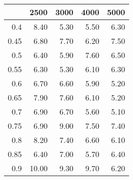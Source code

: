 \begin{table}[ht]
\centering
\begin{tabular}{rrrrr}
  \hline
 & 2500 & 3000 & 4000 & 5000 \\ 
  \hline
0.4 & 8.40 & 5.30 & 5.50 & 6.30 \\ 
  0.45 & 6.80 & 7.70 & 6.20 & 7.50 \\ 
  0.5 & 6.40 & 5.90 & 7.60 & 6.50 \\ 
  0.55 & 6.30 & 5.30 & 6.10 & 6.30 \\ 
  0.6 & 6.70 & 6.60 & 5.90 & 5.20 \\ 
  0.65 & 7.90 & 7.60 & 6.10 & 5.20 \\ 
  0.7 & 6.90 & 6.70 & 5.60 & 5.10 \\ 
  0.75 & 6.90 & 9.00 & 7.50 & 7.40 \\ 
  0.8 & 8.20 & 7.40 & 6.60 & 6.10 \\ 
  0.85 & 6.40 & 7.00 & 5.70 & 6.40 \\ 
  0.9 & 10.00 & 9.30 & 9.70 & 6.20 \\ 
   \hline
\end{tabular}
\end{table}
